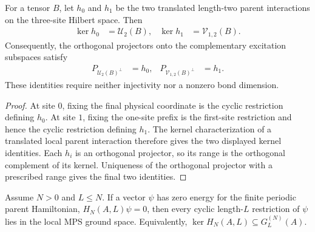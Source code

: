 \begin{lemma}
    \label{thm:adjacent_two_site_local_terms_open_chain}
    \leanok
    For a tensor $B$, let $h_0$ and $h_1$ be the two translated length-two parent
    interactions on the three-site Hilbert space. Then
    \begin{align}
        \ker h_0 & =\mathcal U_2(B),     &
        \ker h_1 & =\mathcal V_{1,2}(B).
    \end{align}
    Consequently, the orthogonal projectors onto the complementary excitation
    subspaces satisfy
    \begin{align}
        P_{\mathcal U_2(B)^\perp}     & =h_0, &
        P_{\mathcal V_{1,2}(B)^\perp} & =h_1.
    \end{align}
    These identities require neither injectivity nor a nonzero bond dimension.
\end{lemma}

\begin{proof}
    \leanok
    At site $0$, fixing the final physical coordinate is the cyclic restriction
    defining $h_0$. At site $1$, fixing the one-site prefix is the first-site
    restriction and hence the cyclic restriction defining $h_1$. The kernel
    characterization of a translated local parent interaction therefore gives
    the two displayed kernel identities. Each $h_i$ is an orthogonal projector,
    so its range is the orthogonal complement of its kernel. Uniqueness of the
    orthogonal projector with a prescribed range gives the final two identities.
\end{proof}

\begin{lemma}
    \label{thm:parent_hamiltonian_kernel_le_chain_ground_space}
    \leanok
    Assume $N>0$ and $L\le N$. If a vector $\psi$ has zero energy for the
    finite periodic parent Hamiltonian, $H_N(A,L)\psi=0$, then every cyclic
    length-$L$ restriction of $\psi$ lies in the local MPS ground space.
    Equivalently, $\ker H_N(A,L)\subseteq G_L^{(N)}(A)$.
\end{lemma}

